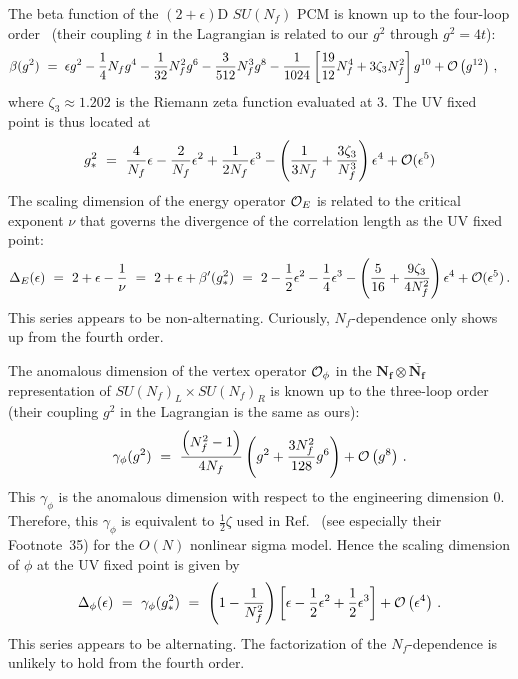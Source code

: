 \documentclass[
 reprint,







nofootinbib,


 amsmath,amssymb,
 aps,
 prd






tightenlines
]{revtex4-2}
\begin{document}
The beta function of the $(2+\epsilon)$D $SU(N_f)$ PCM is known up to the four-loop order~\cite{Hikami:1980hi,Hikami:1982ak,Wegner:1989ss} (their coupling $t$ in the Lagrangian is related to our $g^2$ through $g^2=4t$):
\begin{align}
\begin{split}
    \beta(g^2) \ =&\: \ \epsilon g^2 -\frac{1}{4} N_f g^4
    -\frac{1}{32} N_f^2 g^6-\frac{3}{512} N_f^3 g^8 - \frac{1}{1024}\left[\frac{19}{12}N_f^4 + 3\zeta_3N_f^2 \right]g^{10}
    + \mathcal{O}\left(g^{12}\right)\,,
\end{split}
\end{align}
where $\zeta_3\approx 1.202$ is the Riemann zeta function evaluated at $3$.
The UV fixed point is thus located at
\begin{equation}
    g_*^2\ =\ \frac{4}{N_f}\epsilon - \frac{2}{N_f}\epsilon^2 + \frac{1}{2N_f}\epsilon^3
    - \left(\frac{1}{3N_f}
    +\frac{3\zeta_3}{N_f^3}\right)\epsilon^4
    + \mathcal{O}(\epsilon^5)
\end{equation}
The scaling dimension of the energy operator $\mathcal{O}_E$ is related to the critical exponent $\nu$ that governs the divergence of the correlation length as the UV fixed point:
\begin{equation}\label{eq:Delta_energy}
\begin{split}
    \Delta_E(\epsilon)
    \ =\
    2+\epsilon - \frac{1}{\nu}
    \ =\
    2 + \epsilon +\beta'(g^2_{*}) \ =\
    2 - \frac{1}{2}\epsilon^2 - \frac{1}{4}\epsilon^3
    - \left( \frac{5}{16} + \frac{9\zeta_3}{4N_f^2} \right)\epsilon^4
    + \mathcal{O}(\epsilon^5)
    \,.
\end{split}
\end{equation}
This series appears to be non-alternating. Curiously, $N_f$-dependence only
shows up from the fourth order.

The anomalous dimension of the vertex operator $\mathcal{O}_{\phi}$ in the $\boldsymbol{N_f}\otimes\overline{\boldsymbol{N_f}}$ representation of $SU(N_f)_L\times SU(N_f)_R$ is known up to the three-loop order~\cite{McKane:1979cm} (their coupling $g^2$ in the Lagrangian is the same as ours):
\begin{align}
    \gamma_{\phi}(g^2) \  = \ \frac{\left(N_f^2-1\right)}{4 N_f} \left(g^2
    + \frac{3 N_f^2}{128}  g^6\right) +\mathcal{O}\left(g^8\right)\,.
\end{align}
This $\gamma_{\phi}$ is the anomalous dimension with respect to the engineering dimension $0$.
Therefore, this $\gamma_{\phi}$ is equivalent to $\frac{1}{2}\zeta$ used in Ref.~\cite[Section~4.1.3]{Henriksson:2022rnm} (see especially their Footnote~35) for the $O(N)$ nonlinear sigma model.
Hence the scaling dimension of $\phi$ at the UV fixed point is given by
\begin{align}
    \label{eq:Delta_phi}
    \Delta_{\phi}(\epsilon)
    \ =\ \gamma_{\phi}(g_*^2)
    \ = \ \left(1-\frac{1}{N_f^2}\right)\left[\epsilon
    - \frac{1}{2}  \epsilon^2 +  \frac{1}{2} \epsilon^3\right]
    +\mathcal{O}\left(\epsilon ^4\right)  \,.
\end{align}
This series appears to be alternating.
The factorization of the $N_f$-dependence is unlikely to hold from the fourth order.
\end{document}
